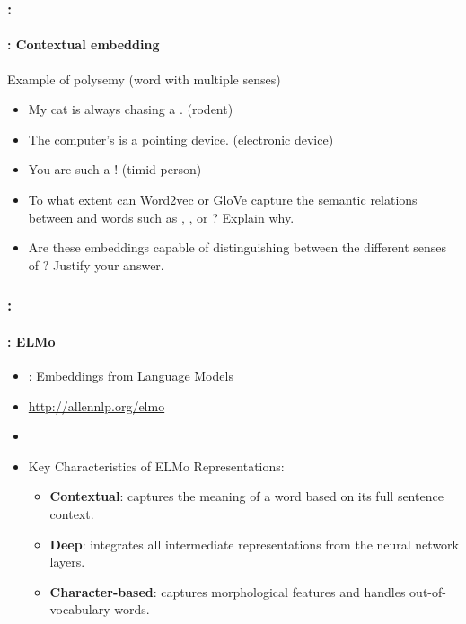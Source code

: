 \documentclass[xcolor=table]{beamer}
\begin{document}
\begin{frame}
	\frametitle{\insertshortsubtitle: \insertsection}
	\framesubtitle{\insertsubsection: Contextual embedding}
	
	\begin{exampleblock}{Example of polysemy (word with multiple senses)}
		\begin{itemize}
			\item My cat is always chasing a . (rodent)
			\item The computer's  is a pointing device. (electronic device)
			\item You are such a ! (timid person)
		\end{itemize}
	\end{exampleblock}
	
	\begin{itemize}
		\item To what extent can Word2vec or GloVe capture the semantic relations between  and words such as , , or ? Explain why.
		\item Are these embeddings capable of distinguishing between the different senses of ? Justify your answer.
	\end{itemize}
	
\end{frame}

\begin{frame}
	\frametitle{\insertshortsubtitle: \insertsection}
	\framesubtitle{\insertsubsection: ELMo}
	
	\begin{minipage}{.65\textwidth}
		\begin{itemize}
			\item {}: Embeddings from Language Models
			\item \url{http://allennlp.org/elmo} 
			\item \cite{2018-peters-al}
			\item Key Characteristics of ELMo Representations:
			\begin{itemize}
				\item \textbf{Contextual}: captures the meaning of a word based on its full sentence context.
				\item \textbf{Deep}: integrates all intermediate representations from the neural network layers.
				\item \textbf{Character-based}: captures morphological features and handles out-of-vocabulary words.
			\end{itemize}
		\end{itemize}
	\end{minipage}
	\begin{minipage}{.33\textwidth}
		\vspace{1.8cm}
	\end{minipage}
	
\end{frame}
\end{document}
